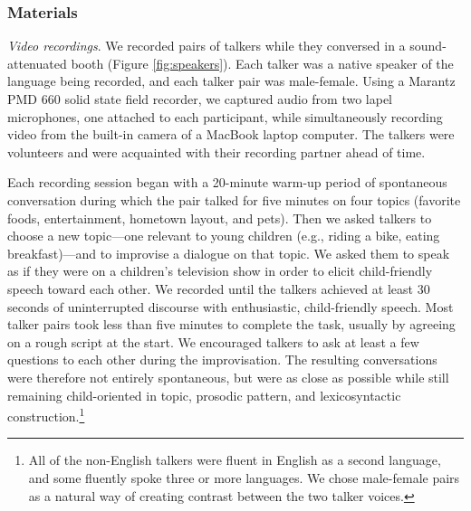 \documentclass[authoryear, 12pt]{elsarticle}
\begin{document}
\subsubsection*{Materials}

\textit{Video recordings}. We recorded pairs of talkers while they conversed in a sound-attenuated booth (Figure \ref{fig:speakers}). Each talker was a native speaker of the language being recorded, and each talker pair was male-female. Using a Marantz PMD 660 solid state field recorder, we captured audio from two lapel microphones, one attached to each participant, while simultaneously recording video from the built-in camera of a MacBook laptop computer. The talkers were volunteers and were acquainted with their recording partner ahead of time.

Each recording session began with a 20-minute warm-up period of spontaneous conversation during which the pair talked for five minutes on four topics (favorite foods, entertainment, hometown layout, and pets). Then we asked talkers to choose a new topic---one relevant to young children (e.g., riding a bike, eating breakfast)---and to improvise a dialogue on that topic. We asked them to speak as if they were on a children's television show in order to elicit child-friendly speech toward each other. We recorded until the talkers achieved at least 30 seconds of uninterrupted discourse with enthusiastic, child-friendly speech. Most talker pairs took less than five minutes to complete the task, usually by agreeing on a rough script at the start. We encouraged talkers to ask at least a few questions to each other during the improvisation. The resulting conversations were therefore not entirely spontaneous, but were as close as possible while still remaining child-oriented in topic, prosodic pattern, and lexicosyntactic construction.\footnote{All of the non-English talkers were fluent in English as a second language, and some fluently spoke three or more languages. We chose male-female pairs as a natural way of creating contrast between the two talker voices.}
\end{document}
